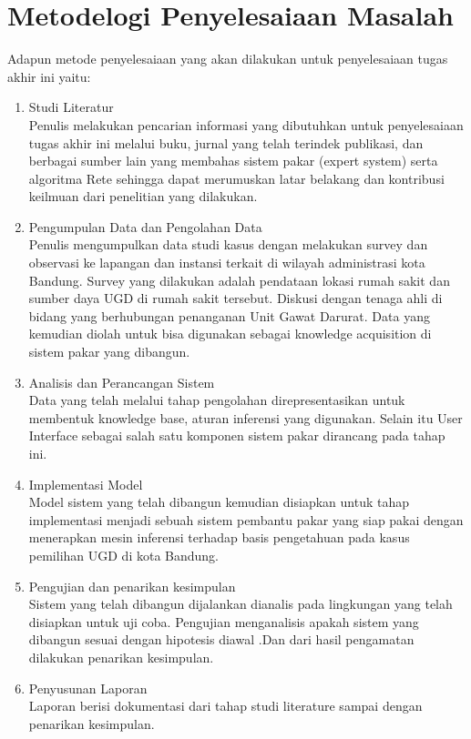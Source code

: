 \section{Metodelogi Penyelesaiaan Masalah}
Adapun metode penyelesaiaan yang akan dilakukan untuk penyelesaiaan tugas akhir ini yaitu:
\begin{enumerate}
	\item Studi Literatur\\
	Penulis melakukan pencarian informasi yang dibutuhkan untuk penyelesaiaan tugas akhir ini melalui buku, jurnal yang telah terindek publikasi, dan berbagai sumber lain yang membahas sistem pakar (expert system) serta algoritma Rete sehingga dapat merumuskan latar belakang dan kontribusi keilmuan dari penelitian yang dilakukan.
	\item Pengumpulan Data dan Pengolahan Data\\
	Penulis mengumpulkan data studi kasus dengan melakukan survey dan observasi ke lapangan dan instansi terkait di wilayah administrasi kota Bandung. Survey yang dilakukan adalah pendataan lokasi rumah sakit dan sumber daya UGD di rumah sakit tersebut. Diskusi dengan tenaga ahli di bidang yang berhubungan penanganan Unit Gawat Darurat. Data yang kemudian diolah untuk bisa digunakan sebagai knowledge acquisition di sistem pakar yang dibangun.
	\item Analisis dan Perancangan Sistem\\
	Data yang telah melalui tahap pengolahan direpresentasikan untuk membentuk knowledge base, aturan inferensi yang digunakan. Selain itu User Interface sebagai salah satu komponen sistem pakar dirancang pada tahap ini.
	\item Implementasi Model\\
	Model sistem yang telah dibangun kemudian disiapkan untuk tahap implementasi menjadi sebuah sistem pembantu pakar yang siap pakai dengan menerapkan mesin inferensi terhadap basis pengetahuan pada kasus pemilihan UGD di kota Bandung.
	\item Pengujian dan penarikan kesimpulan\\
	Sistem yang telah dibangun dijalankan dianalis pada lingkungan yang telah disiapkan untuk uji coba. Pengujian menganalisis apakah sistem yang dibangun sesuai dengan hipotesis diawal .Dan dari hasil pengamatan dilakukan penarikan kesimpulan.
	\item Penyusunan Laporan\\
	Laporan berisi dokumentasi dari tahap studi literature sampai dengan penarikan kesimpulan.
\end{enumerate}

